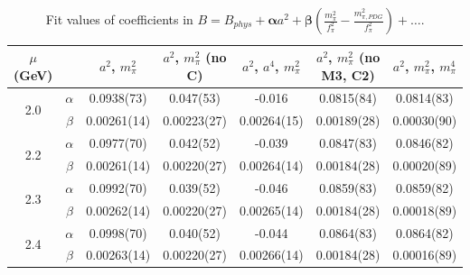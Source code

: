 \documentclass[12pt]{extarticle}
\begin{document}
\begin{table}[h!]
\begin{center}
\begin{tabular}{|c c|c|c|c|c|c|}
\hline
$\mu$ (GeV) &  & $a^2$, $m_\pi^2$& $a^2$, $m_\pi^2$ (no C)& $a^2$, $a^4$, $m_\pi^2$& $a^2$, $m_\pi^2$ (no M3, C2)& $a^2$, $m_\pi^2$, $m_\pi^4$\\
\hline
\multirow{2}{0.5in}{2.0} & $\alpha$ & 0.0938(73)& 0.047(53)& -0.016& 0.0815(84)& 0.0814(83)\\
 & $\beta$ & 0.00261(14)& 0.00223(27)& 0.00264(15)& 0.00189(28)& 0.00030(90)\\
\hline
\multirow{2}{0.5in}{2.2} & $\alpha$ & 0.0977(70)& 0.042(52)& -0.039& 0.0847(83)& 0.0846(82)\\
 & $\beta$ & 0.00261(14)& 0.00220(27)& 0.00264(14)& 0.00184(28)& 0.00020(89)\\
\hline
\multirow{2}{0.5in}{2.3} & $\alpha$ & 0.0992(70)& 0.039(52)& -0.046& 0.0859(83)& 0.0859(82)\\
 & $\beta$ & 0.00262(14)& 0.00220(27)& 0.00265(14)& 0.00184(28)& 0.00018(89)\\
\hline
\multirow{2}{0.5in}{2.4} & $\alpha$ & 0.0998(70)& 0.040(52)& -0.044& 0.0864(83)& 0.0864(82)\\
 & $\beta$ & 0.00263(14)& 0.00220(27)& 0.00266(14)& 0.00184(28)& 0.00016(89)\\
\hline
\end{tabular}
\caption{Fit values of coefficients in $B = B_{phys} + \mathbf{\alpha} a^2 + \mathbf{\beta}\left(\frac{m_\pi^2}{f_\pi^2}-\frac{m_{\pi,PDG}^2}{f_\pi^2}\right) + \ldots$.}
\end{center}
\end{table}




















\clearpage
\end{document}
